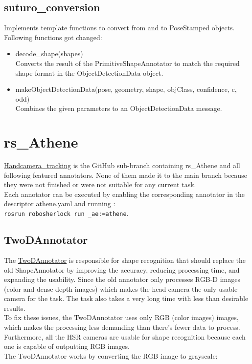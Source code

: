 \documentclass[main.tex]{subfiles}
\begin{document}
\subsection{suturo\_conversion}
Implements template functions to convert from and to PoseStamped objects.
Following functions got changed:

\begin{itemize}
\item decode\_shape(shapes)\\
Converts the result of the PrimitiveShapeAnnotator to match the required shape format in the ObjectDetectionData object.

\item makeObjectDetectionData(pose, geometry, shape, objClass, confidence, c, odd)\\
Combines the given parameters to an ObjectDetectionData message.
\end{itemize}

			\section{rs\_Athene}
\href{https://github.com/SUTURO/suturo_perception/tree/Handcamera_tracking}{Handcamera\_tracking} is the GitHub sub-branch containing rs\_Athene and all following featured annotators. 
None of them made it to the main branch because they were not finished or were not suitable for any current task. \\
Each annotator can be executed by enabling the corresponding annotator in the descriptor athene.yaml and running : \\
\texttt{rosrun robosherlock run \_ae:=athene}. 

				\subsection{TwoDAnnotator}
The \href{https://github.com/SUTURO/suturo_perception/blob/Handcamera_tracking/rs_Athene/src/TwoDAnnotator.cpp}{TwoDAnnotator} is responsible for shape recognition that should replace the old ShapeAnnotator by improving the accuracy, reducing processing time, and expanding the usability. 
Since the old annotator only processes RGB-D images (color and dense depth images) which makes the head-camera the only usable camera for the task. The task also takes a very long time with less than desirable results. \\
To fix these issues, the TwoDAnnotator uses only RGB (color images) images, which makes the processing less demanding than there's fewer data to process. Furthermore, all the HSR cameras are usable for shape recognition because each one is capable of outputting RGB images. \\
The TwoDAnnotator works by converting the RGB image to grayscale:
\end{document}
